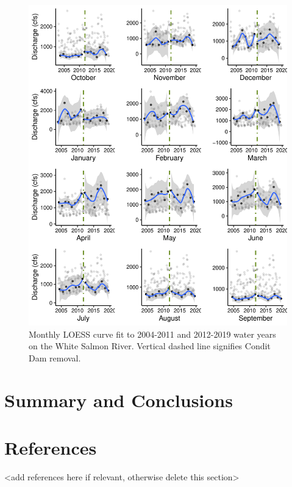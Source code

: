 \documentclass[
  12pt,
]{article}
\begin{document}
\begin{figure}
\centering
\includegraphics{WhiteSalmon_WriteUp_files/figure-latex/fig9-1.pdf}
\caption{Monthly LOESS curve fit to 2004-2011 and 2012-2019 water years
on the White Salmon River. Vertical dashed line signifies Condit Dam
removal.}
\end{figure}

\newpage

\hypertarget{summary-and-conclusions}{%
\section{Summary and Conclusions}\label{summary-and-conclusions}}

\newpage

\hypertarget{references}{%
\section{References}\label{references}}

\textless add references here if relevant, otherwise delete this
section\textgreater{}
\end{document}

